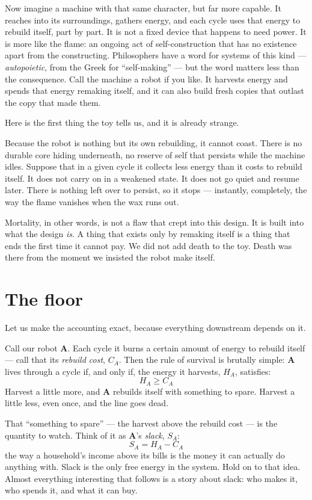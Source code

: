 \documentclass{article}
\begin{document}
Now imagine a machine with that same character, but far more capable. It reaches into its surroundings, gathers energy, and each cycle uses that energy to rebuild itself, part by part. It is not a fixed device that happens to need power. It is more like the flame: an ongoing act of self-construction that has no existence apart from the constructing. Philosophers have a word for systems of this kind --- \emph{autopoietic}, from the Greek for ``self-making'' --- but the word matters less than the consequence. Call the machine a robot if you like. It harvests energy and spends that energy remaking itself, and it can also build fresh copies that outlast the copy that made them.

Here is the first thing the toy tells us, and it is already strange.

Because the robot is nothing but its own rebuilding, it cannot coast. There is no durable core hiding underneath, no reserve of self that persists while the machine idles. Suppose that in a given cycle it collects less energy than it costs to rebuild itself. It does not carry on in a weakened state. It does not go quiet and resume later. There is nothing left over to persist, so it stops --- instantly, completely, the way the flame vanishes when the wax runs out.

Mortality, in other words, is not a flaw that crept into this design. It is built into what the design \emph{is}. A thing that exists only by remaking itself is a thing that ends the first time it cannot pay. We did not add death to the toy. Death was there from the moment we insisted the robot make itself.

\section*{The floor}

Let us make the accounting exact, because everything downstream depends on it.

Call our robot \textbf{A}. Each cycle it burns a certain amount of energy to rebuild itself --- call that its \emph{rebuild cost}, \( C_A \). Then the rule of survival is brutally simple: \textbf{A} lives through a cycle if, and only if, the energy it harvests, \( H_A \), satisfies:
\[
H_A \geq C_A
\]
Harvest a little more, and \textbf{A} rebuilds itself with something to spare. Harvest a little less, even once, and the line goes dead.

That ``something to spare'' --- the harvest above the rebuild cost --- is the quantity to watch. Think of it as \textbf{A}'s \emph{slack}, \( S_A \):
\[
S_A = H_A - C_A
\]
the way a household's income above its bills is the money it can actually do anything with. Slack is the only free energy in the system. Hold on to that idea. Almost everything interesting that follows is a story about slack: who makes it, who spends it, and what it can buy.
\end{document}
